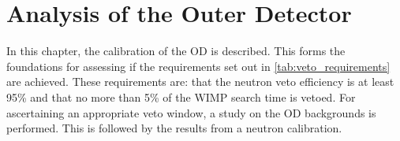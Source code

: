 \chapter{Analysis of the Outer Detector} \label{chap:analysis_of_the_od}

\par
In this chapter, the calibration of the OD is described.
This forms the foundations for assessing if the requirements set out in \autoref{tab:veto_requirements} are achieved.
These requirements are: that the neutron veto efficiency is at least 95\% and that no more than 5\% of the WIMP search time is vetoed.
For ascertaining an appropriate veto window, a study on the OD backgrounds is performed. 
This is followed by the results from a neutron calibration.



\clearpage

\clearpage


%